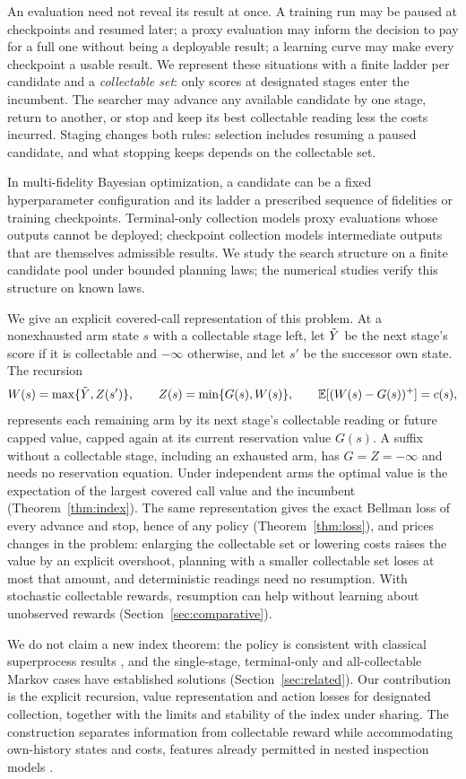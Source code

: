An evaluation need not reveal its result at once. A training run may be paused at checkpoints
and resumed later; a proxy evaluation may inform the decision to pay for a full one without
being a deployable result; a learning curve may make every checkpoint a usable result. We
represent these situations with a finite ladder per candidate and a \emph{collectable set}:
only scores at designated stages enter the incumbent. The searcher may advance any available
candidate by one stage, return to another, or stop and keep its best collectable reading less
the costs incurred. Staging changes both rules: selection includes resuming a paused candidate,
and what stopping keeps depends on the collectable set.

In multi-fidelity Bayesian optimization, a candidate can be a fixed hyperparameter
configuration and its ladder a prescribed sequence of fidelities or training checkpoints.
Terminal-only collection models proxy evaluations whose outputs cannot be deployed;
checkpoint collection models intermediate outputs that are themselves admissible results.
We study the search structure on a finite candidate pool under bounded planning laws;
the numerical studies verify this structure on known laws.

We give an explicit covered-call representation of this problem. At a nonexhausted arm
state $s$ with a collectable stage left, let $\tilde Y$ be the next stage's score if it
is collectable and $-\infty$ otherwise, and let $s'$ be the successor own state.
The recursion
\[
W(s)=\max\{\tilde Y,Z(s')\},\qquad Z(s)=\min\{G(s),W(s)\},\qquad
\mathbb{E}[(W(s)-G(s))^+]=c(s),
\]
represents each remaining arm by its next stage's collectable reading or future capped
value, capped again at its current reservation value $G(s)$. A suffix without a collectable
stage, including an exhausted arm, has $G=Z=-\infty$ and needs no reservation equation.
Under independent arms the optimal value is the expectation of the largest
covered call value and the incumbent (Theorem~\ref{thm:index}). The same representation gives
the exact Bellman loss of every advance and stop, hence of any policy
(Theorem~\ref{thm:loss}), and prices changes in the problem: enlarging the collectable set or
lowering costs raises the value by an explicit overshoot, planning with a smaller collectable
set loses at most that amount, and deterministic readings need no resumption.
With stochastic collectable rewards, resumption can help without learning about
unobserved rewards (Section~\ref{sec:comparative}).

We do not claim a new index theorem: the policy is consistent with classical superprocess
results \citep{whittle1980gittins,glazebrook1982whittle}, and the single-stage, terminal-only
and all-collectable Markov cases have established solutions (Section~\ref{sec:related}). Our
contribution is the explicit recursion, value representation and action losses for designated
collection, together with the limits and stability of the index under sharing. The construction separates information from collectable reward
while accommodating own-history states and costs, features already permitted in nested
inspection models \citep[Section~4.1]{bowers2024nested}.

